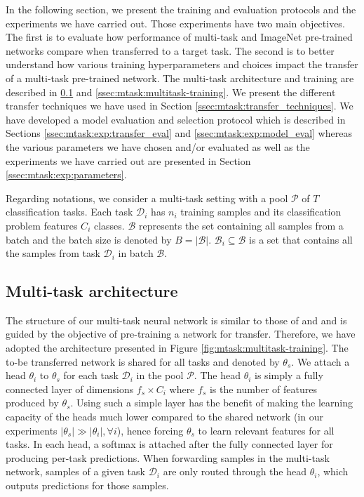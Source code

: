 In the following section, we present the training and evaluation protocols and the experiments we have carried out. Those experiments have two main objectives. The first is to evaluate how performance of multi-task and ImageNet pre-trained networks compare when transferred to a target task. The second is to better understand how various training hyperparameters and choices impact the transfer of a multi-task pre-trained network. The multi-task architecture and training are described in \ref{ssec:mtask:multitask-architecture} and \ref{ssec:mtask:multitask-training}. We present the different transfer techniques we have used in Section \ref{ssec:mtask:transfer_techniques}. We have developed a model evaluation and selection protocol which is described in Sections \ref{ssec:mtask:exp:transfer_eval} and \ref{ssec:mtask:exp:model_eval} whereas the various parameters we have chosen and/or evaluated as well as the experiments we have carried out are presented in Section \ref{ssec:mtask:exp:parameters}. 

Regarding notations, we consider a multi-task setting with a pool $\mathcal{P}$ of $T$ classification tasks. Each task $\mathcal{D}_i$ has $n_{i}$ training samples and its classification problem features $C_{i}$ classes. $\mathcal{B}$ represents the set containing all samples from a batch and the batch size is denoted by $B = \left|\mathcal{B}\right|$. $\mathcal{B}_{i} \subseteq \mathcal{B}$ is a set that contains all the samples from task $\mathcal{D}_i$ in batch $\mathcal{B}$. 

\subsection{Multi-task architecture}
\label{ssec:mtask:multitask-architecture}

The structure of our multi-task neural network is similar to those of \citeauthor{shang2019and} \cite{shang2019and} and \citeauthor{strezoski2019many} \cite{strezoski2019many} and is guided by the objective of pre-training a network for transfer. Therefore, we have adopted the architecture presented in Figure \ref{fig:mtask:multitask-training}. The to-be transferred network is shared for all tasks and denoted by $\theta_s$. We attach a head $\theta_i$ to $\theta_s$ for each task $\mathcal{D}_i$ in the pool $\mathcal{P}$. The head $\theta_i$ is simply a fully connected layer of dimensions $f_s\times C_{i}$ where $f_s$ is the number of features produced by $\theta_s$. Using such a simple layer has the benefit of making the learning capacity of the heads much lower compared to the shared network (in our experiments $|\theta_s| \gg |\theta_i|, \forall i$), hence forcing $\theta_s$ to learn relevant features for all tasks. In each head, a softmax is attached after the fully connected layer for producing per-task predictions. When forwarding samples in the multi-task network, samples of a given task $\mathcal{D}_i$ are only routed through the head $\theta_i$, which outputs predictions for those samples. 

